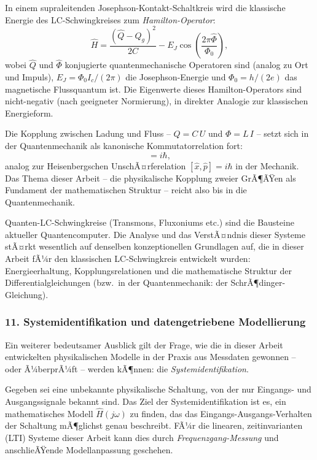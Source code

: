 ﻿\documentclass[12pt, a4paper]{article}
\begin{document}
	In einem supraleitenden Josephson-Kontakt-Schaltkreis wird die klassische Energie des LC-Schwingkreises zum \textit{Hamilton-Operator}:
	\begin{equation}
		\hat{H} = \frac{(\hat{Q} - Q_g)^2}{2C} - E_J \cos\left(\frac{2\pi\hat{\Phi}}{\Phi_0}\right),
	\end{equation}
	wobei $\hat{Q}$ und $\hat{\Phi}$ konjugierte quantenmechanische Operatoren sind (analog zu Ort und Impuls), $E_J = \Phi_0 I_c / (2\pi)$ die Josephson-Energie und $\Phi_0 = h/(2e)$ das magnetische Flussquantum ist. Die Eigenwerte dieses Hamilton-Operators sind nicht-negativ (nach geeigneter Normierung), in direkter Analogie zur klassischen Energieform.

	Die Kopplung zwischen Ladung und Fluss -- $Q = C\,U$ und $\Phi = L\,I$ -- setzt sich in der Quantenmechanik als kanonische Kommutatorrelation fort:
	\begin{equation}
		[\hat{\Phi}, \hat{Q}] = i\hbar,
	\end{equation}
	analog zur Heisenbergschen UnschÃ¤rferelation $[\hat{x}, \hat{p}] = i\hbar$ in der Mechanik. Das Thema dieser Arbeit -- die physikalische Kopplung zweier GrÃ¶ÃŸen als Fundament der mathematischen Struktur -- reicht also bis in die Quantenmechanik.

	Quanten-LC-Schwingkreise (Transmons, Fluxoniums etc.) sind die Bausteine aktueller Quantencomputer. Die Analyse und das VerstÃ¤ndnis dieser Systeme stÃ¤rkt wesentlich auf denselben konzeptionellen Grundlagen auf, die in dieser Arbeit fÃ¼r den klassischen LC-Schwingkreis entwickelt wurden: Energieerhaltung, Kopplungsrelationen und die mathematische Struktur der Differentialgleichungen (bzw.\ in der Quantenmechanik: der SchrÃ¶dinger-Gleichung).

	\subsubsection*{11. \quad Systemidentifikation und datengetriebene Modellierung}

	Ein weiterer bedeutsamer Ausblick gilt der Frage, wie die in dieser Arbeit entwickelten physikalischen Modelle in der Praxis aus Messdaten gewonnen -- oder Ã¼berprÃ¼ft -- werden kÃ¶nnen: die \textit{Systemidentifikation}.

	Gegeben sei eine unbekannte physikalische Schaltung, von der nur Eingangs- und Ausgangssignale bekannt sind. Das Ziel der Systemidentifikation ist es, ein mathematisches Modell $\hat{H}(j\omega)$ zu finden, das das Eingangs-Ausgangs-Verhalten der Schaltung mÃ¶glichst genau beschreibt. FÃ¼r die linearen, zeitinvarianten (LTI) Systeme dieser Arbeit kann dies durch \textit{Frequenzgang-Messung} und anschlieÃŸende Modellanpassung geschehen.
\end{document}
